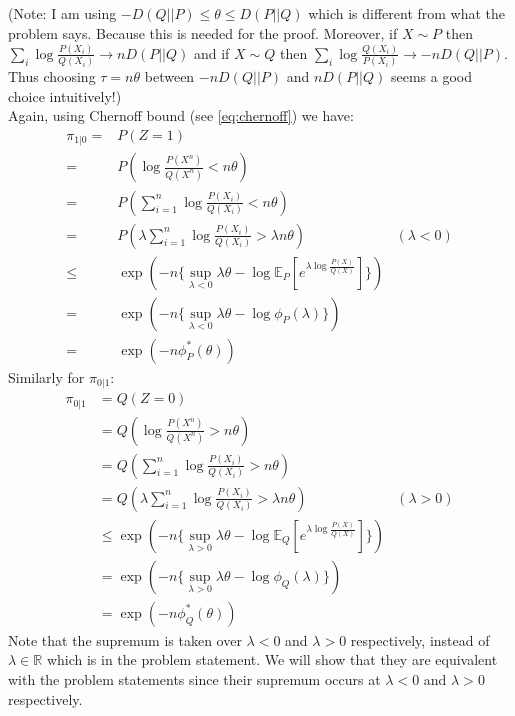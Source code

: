 \documentclass{article}
\numberwithin{equation}{section}
\newcommand{\EX}[2][]{\mathbb{E}_{#1}\left[#2\right]}%
\begin{document}
\subsection{}

(Note: I am using \(-D(Q||P) \le \theta \le D(P||Q)\) which is different from what the problem says. Because this is needed for the proof.
Moreover, if \(X\sim P\) then \(\sum_i \log \frac{P(X_i)}{Q(X_i)} \to nD(P||Q)\) and if \(X\sim Q\) then \(\sum_i \log \frac{Q(X_i)}{P(X_i)} \to -nD(Q||P)\).
Thus choosing \(\tau = n\theta\) between \(-nD(Q||P)\) and \(nD(P||Q)\) seems a good choice intuitively!)\\
Again, using Chernoff bound (see \eqref{eq:chernoff}) we have:
\begin{align}
\pi_{1|0} =& P(Z=1) \\
=& P\left( \log \frac{P(X^n)}{Q(X^n)} < n\theta \right)\\
=& P\left( \sum_{i=1}^n \log \frac{P(X_i)}{Q(X_i)} < n\theta \right)\\
=& P\left( \lambda \sum_{i=1}^n \log \frac{P(X_i)}{Q(X_i)} > \lambda n\theta \right) & (\lambda < 0)\\
\le& \exp (-n \{\sup_{\lambda < 0} \lambda \theta - \log \EX[P]{e^{\lambda \log \frac{P(X)}{Q(X)}}}\})\\
=& \exp (-n \{\sup_{\lambda < 0} \lambda \theta - \log \phi_P(\lambda)\})\\
=& \exp(-n \phi_P^*(\theta))
\end{align}
Similarly for \(\pi_{0|1}\):
\begin{align}
\pi_{0|1} &= Q(Z=0) \\
&= Q\left( \log \frac{P(X^n)}{Q(X^n)} > n\theta \right)\\
&= Q\left( \sum_{i=1}^n \log \frac{P(X_i)}{Q(X_i)} > n\theta \right)\\
&= Q\left( \lambda \sum_{i=1}^n \log \frac{P(X_i)}{Q(X_i)} > \lambda n\theta \right) & (\lambda > 0)\\
&\le \exp (-n \{\sup_{\lambda > 0} \lambda \theta - \log \EX[Q]{e^{\lambda \log \frac{P(X)}{Q(X)}}}\})\\
&= \exp (-n \{\sup_{\lambda > 0} \lambda \theta - \log \phi_Q(\lambda)\})\\
&= \exp(-n \phi_Q^*(\theta))
\end{align}
Note that the supremum is taken over \(\lambda < 0\) and \(\lambda > 0\) respectively, instead of \(\lambda \in \mathbb{R}\) which is in the problem statement.
We will show that they are equivalent with the problem statements since their supremum occurs at \(\lambda < 0\) and \(\lambda > 0\) respectively.\\
\end{document}
